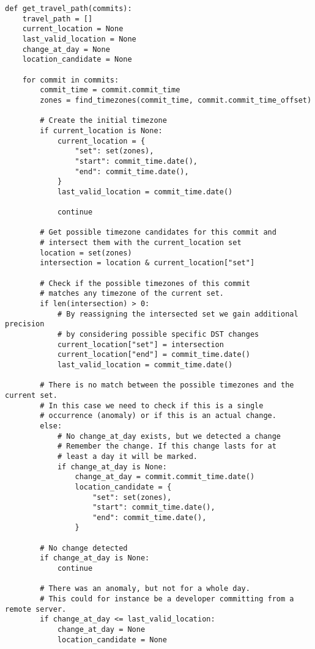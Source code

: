 \begin{verbatim}
def get_travel_path(commits):
    travel_path = []
    current_location = None
    last_valid_location = None
    change_at_day = None
    location_candidate = None

    for commit in commits:
        commit_time = commit.commit_time
        zones = find_timezones(commit_time, commit.commit_time_offset)

        # Create the initial timezone
        if current_location is None:
            current_location = {
                "set": set(zones),
                "start": commit_time.date(),
                "end": commit_time.date(),
            }
            last_valid_location = commit_time.date()

            continue

        # Get possible timezone candidates for this commit and
        # intersect them with the current_location set
        location = set(zones)
        intersection = location & current_location["set"]

        # Check if the possible timezones of this commit
        # matches any timezone of the current set.
        if len(intersection) > 0:
            # By reassigning the intersected set we gain additional precision
            # by considering possible specific DST changes
            current_location["set"] = intersection
            current_location["end"] = commit_time.date()
            last_valid_location = commit_time.date()

        # There is no match between the possible timezones and the current set.
        # In this case we need to check if this is a single
        # occurrence (anomaly) or if this is an actual change.
        else:
            # No change_at_day exists, but we detected a change
            # Remember the change. If this change lasts for at
            # least a day it will be marked.
            if change_at_day is None:
                change_at_day = commit.commit_time.date()
                location_candidate = {
                    "set": set(zones),
                    "start": commit_time.date(),
                    "end": commit_time.date(),
                }

        # No change detected
        if change_at_day is None:
            continue

        # There was an anomaly, but not for a whole day.
        # This could for instance be a developer committing from a remote server.
        if change_at_day <= last_valid_location:
            change_at_day = None
            location_candidate = None


\end{verbatim}
